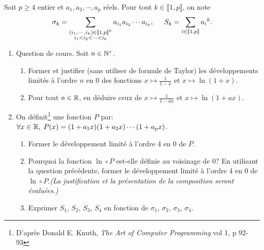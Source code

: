 Soit $p\geq4$ entier et $a_1, a_2, \cdots, a_p$ réels. Pour tout $k \in \llbracket 1,p \rrbracket$, on note
\[
  \sigma_k = \sum_{\substack{(i_1, \cdots, i_k) \in \llbracket 1, p \rrbracket^k \\ i_1 < i_2 < \cdots < i_k}}a_{i_1}a_{i_2}\cdots a_{i_k},\hspace{0.5cm}
  S_k = \sum_{i \in \llbracket 1,p \rrbracket}{a_i}^k.
\]
\begin{enumerate}
  \item Question de cours. Soit $n \in \mathbb{N}^*$. 
  \begin{enumerate}
    \item Former et justifier (sans utiliser de formule de Taylor) les développements limités à l'ordre $n$ en $0$ des fonctions $x\mapsto \frac{1}{1-x}$ et $x\mapsto \ln(1+x)$.
    \item Pour tout $a \in \mathbb{R}$, en déduire ceux de $x\mapsto \frac{1}{1 - ax}$ et $x\mapsto \ln(1 + ax)$.
  \end{enumerate}
  
  \item On définit\footnote{D'après Donald E. Knuth, \emph{The Art of Computer Programming} vol 1, p 92-93} une fonction $P$ par: 
  $\forall x\in \mathbb{R}, \; P(x) = (1+a_1x)(1+a_2x) \cdots (1+a_px)$.
  \begin{enumerate}
    \item Former le développement limité à l'ordre 4 en $0$ de $P$.
    \item Pourquoi la fonction $\ln \circ P$ est-elle définie au voisinage de $0$? En utilisant la question précédente, former le développement limité à l'ordre 4 en $0$ de $\ln \circ P$.\newline \emph{(La justification et la présentation de la composition seront évaluées.)} 
    \item Exprimer $S_1$, $S_2$, $S_3$, $S_4$ en fonction de $\sigma_1$, $\sigma_2$, $\sigma_3$, $\sigma_4$.
  \end{enumerate}

\end{enumerate}
